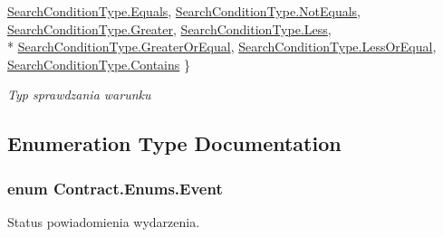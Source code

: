 \begin{DoxyCompactItemize}
\hyperlink{namespace_contract_1_1_enums_aaec9cf8d7ed5b1eb4f9b9252c3ac10aaa0ccb67e7eaae09d9e4078d161eeca100}{Search\+Condition\+Type.\+Equals}, 
\hyperlink{namespace_contract_1_1_enums_aaec9cf8d7ed5b1eb4f9b9252c3ac10aaa34b5af77cc5bf3a5f2a999f11f578255}{Search\+Condition\+Type.\+Not\+Equals}, 
\hyperlink{namespace_contract_1_1_enums_aaec9cf8d7ed5b1eb4f9b9252c3ac10aaa8768a6821cd735aea4f5b0df88c1fc6a}{Search\+Condition\+Type.\+Greater}, 
\hyperlink{namespace_contract_1_1_enums_aaec9cf8d7ed5b1eb4f9b9252c3ac10aaa1cfdf0e8d0c87a228c1f40d9bee7888b}{Search\+Condition\+Type.\+Less}, 
\\*
\hyperlink{namespace_contract_1_1_enums_aaec9cf8d7ed5b1eb4f9b9252c3ac10aaa6f2f0aefb3d22da0f3839453add5f937}{Search\+Condition\+Type.\+Greater\+Or\+Equal}, 
\hyperlink{namespace_contract_1_1_enums_aaec9cf8d7ed5b1eb4f9b9252c3ac10aaaa4cbdbb6070a5abb35fc95ecf1e22c14}{Search\+Condition\+Type.\+Less\+Or\+Equal}, 
\hyperlink{namespace_contract_1_1_enums_aaec9cf8d7ed5b1eb4f9b9252c3ac10aaab270372be5b4433b4736daaf25e1c74e}{Search\+Condition\+Type.\+Contains}
 \}
\begin{DoxyCompactList}\small\item\em Typ sprawdzania warunku \end{DoxyCompactList}\end{DoxyCompactItemize}


\subsection{Enumeration Type Documentation}
\hypertarget{namespace_contract_1_1_enums_a195bd5eea92e011927a1913b01a0c517}{}
\subsubsection[{Event}]{\setlength{\rightskip}{0pt plus 5cm}enum {\bf Contract.\+Enums.\+Event}}\label{namespace_contract_1_1_enums_a195bd5eea92e011927a1913b01a0c517}


Status powiadomienia wydarzenia. 

